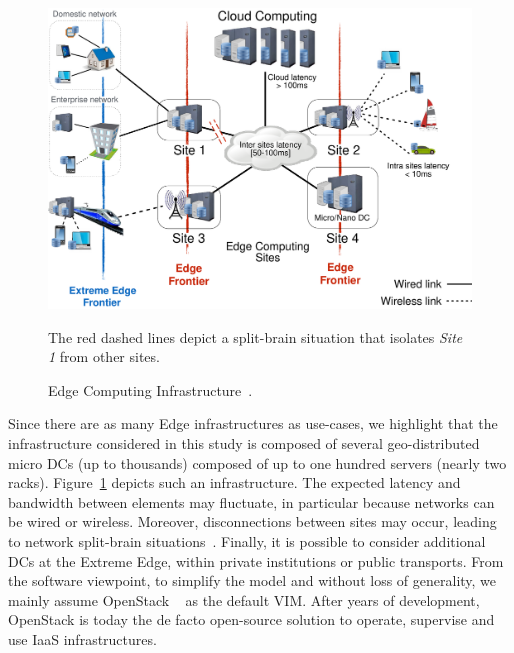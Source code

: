 \begin{figure}[t]
  \centering
  \includegraphics[width=.95\columnwidth]{./figures/figure_fog.pdf}
    \vspace*{-.2cm}
  \caption{Edge Computing Infrastructure~\cite{7923796}.}
    {\small The red dashed lines depict a split-brain situation that isolates
    \emph{Site 1} from other sites.}
  \label{fig:fogedge-archi}
  \vspace*{-.3cm}
\end{figure}

Since there are as many Edge infrastructures as use-cases, we
highlight that the infrastructure considered in this
study is composed
 of several
geo-distributed micro DCs (up to thousands)
composed of up to one hundred servers (nearly two racks).
Figure~\ref{fig:fogedge-archi} depicts such an infrastructure.
The expected latency and bandwidth between elements may fluctuate, in particular because
networks can be wired or wireless. Moreover, disconnections
between sites may occur, leading to network split-brain
situations~\cite{4456903}.
Finally, it is possible to consider additional DCs at the Extreme Edge, within private institutions or public transports.
%
From the software viewpoint, to simplify the model and
without loss of generality, we mainly assume OpenStack ~\cite{openstack:www} as the default VIM.  After years of development, OpenStack is today the de facto open-source solution to operate, supervise and use
IaaS infrastructures.

